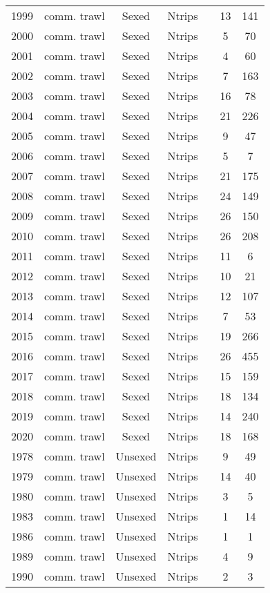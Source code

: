 \begin{longtable}[t]{c>{\centering\arraybackslash}p{3cm}ccccc}
1999 & comm. trawl & Sexed & Ntrips &  & 13 & 141\\
2000 & comm. trawl & Sexed & Ntrips &  & 5 & 70\\
2001 & comm. trawl & Sexed & Ntrips &  & 4 & 60\\
2002 & comm. trawl & Sexed & Ntrips &  & 7 & 163\\
2003 & comm. trawl & Sexed & Ntrips &  & 16 & 78\\
2004 & comm. trawl & Sexed & Ntrips &  & 21 & 226\\
2005 & comm. trawl & Sexed & Ntrips &  & 9 & 47\\
2006 & comm. trawl & Sexed & Ntrips &  & 5 & 7\\
2007 & comm. trawl & Sexed & Ntrips &  & 21 & 175\\
2008 & comm. trawl & Sexed & Ntrips &  & 24 & 149\\
2009 & comm. trawl & Sexed & Ntrips &  & 26 & 150\\
2010 & comm. trawl & Sexed & Ntrips &  & 26 & 208\\
2011 & comm. trawl & Sexed & Ntrips &  & 11 & 6\\
2012 & comm. trawl & Sexed & Ntrips &  & 10 & 21\\
2013 & comm. trawl & Sexed & Ntrips &  & 12 & 107\\
2014 & comm. trawl & Sexed & Ntrips &  & 7 & 53\\
2015 & comm. trawl & Sexed & Ntrips &  & 19 & 266\\
2016 & comm. trawl & Sexed & Ntrips &  & 26 & 455\\
2017 & comm. trawl & Sexed & Ntrips &  & 15 & 159\\
2018 & comm. trawl & Sexed & Ntrips &  & 18 & 134\\
2019 & comm. trawl & Sexed & Ntrips &  & 14 & 240\\
2020 & comm. trawl & Sexed & Ntrips &  & 18 & 168\\
1978 & comm. trawl & Unsexed & Ntrips &  & 9 & 49\\
1979 & comm. trawl & Unsexed & Ntrips &  & 14 & 40\\
1980 & comm. trawl & Unsexed & Ntrips &  & 3 & 5\\
1983 & comm. trawl & Unsexed & Ntrips &  & 1 & 14\\
1986 & comm. trawl & Unsexed & Ntrips &  & 1 & 1\\
1989 & comm. trawl & Unsexed & Ntrips &  & 4 & 9\\
1990 & comm. trawl & Unsexed & Ntrips &  & 2 & 3\\

\end{longtable}
